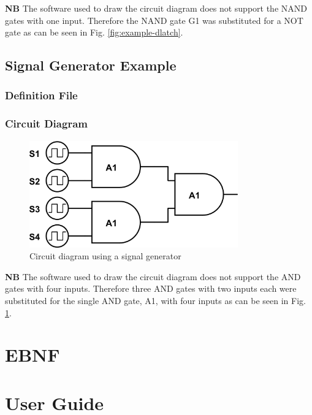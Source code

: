 \documentclass[a4paper,10pt]{article}
\begin{document}
\textbf{NB} The software used to draw the circuit diagram does not support the NAND gates with one input. Therefore the NAND gate G1 was substituted for a NOT gate as can be seen in Fig. \ref{fig:example-dlatch}.

\subsection{Signal Generator Example}

\subsubsection{Definition File}


\subsubsection{Circuit Diagram}
\begin{figure}[h]
 \centering
 \includegraphics[width=9cm]{../../examples/siggen.png}
 \caption{Circuit diagram using a signal generator}
 \label{fig:example-siggen}
\end{figure}

\textbf{NB} The software used to draw the circuit diagram does not support the AND gates with four inputs. Therefore three AND gates with two inputs each were substituted for the single AND gate, A1, with four inputs as can be seen in Fig. \ref{fig:example-siggen}.

\pagebreak

\section{EBNF}
\label{sec:EBNF}

\pagebreak

\section{User Guide}
\label{sec:guide}
\end{document}
